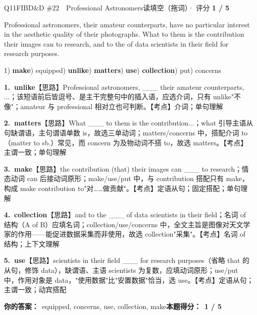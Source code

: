 \begin{qblock}{Q11\quad FIBD\&D \#22\ \ Professional Astronomers}{读填空（拖词）· 评分 \textcolor{cAccent}{\bfseries 1 / 5}}
\begin{promptbox}
Professional astronomers,  their amateur counterparts, have no particular interest in the aesthetic quality of their photographs. What  to them is the contribution their images can  to research, and to the  of data scientists in their field  for research purposes.
\end{promptbox}
{\small 1) \textbf{make}) equipped) \textbf{unlike}) \textbf{matters}) \textbf{use}) \textbf{collection}) put) concerns}
\begin{notebox}\footnotesize
\textbf{1.\ unlike}\quad【思路】Professional astronomers, \_\_\_ their amateur counterparts, ...；该短语前后皆逗号、是主干完整句中的插入语，应选介词，只有 unlike"不像"；amateur 与 professional 相对立也可判断。【考点】介词；单句理解\par\smallskip
\textbf{2.\ matters}\quad【思路】What \_\_\_ to them is the contribution...；what 引导主语从句缺谓语，主句谓语单数 is，故选三单动词；matters/concerns 中，搭配介词 to（matter to sb.）常见，而 concern 为及物动词不搭 to，故选 matters。【考点】主谓一致；单句理解\par\smallskip
\textbf{3.\ make}\quad【思路】the contribution (that) their images can \_\_\_ to research；情态动词 can 后接动词原形；make/use/put 中，与 contribution 搭配只有 make，构成 make contribution to"对……做贡献"。【考点】定语从句；固定搭配；单句理解\par\smallskip
\textbf{4.\ collection}\quad【思路】and to the \_\_\_ of data scientists in their field；名词 of 结构（A of B）应填名词；collection/use/concerns 中，全文主旨是图像对天文学家的作用——能促进数据采集而非使用，故选 collection"采集"。【考点】名词 of 结构；上下文理解\par\smallskip
\textbf{5.\ use}\quad【思路】scientists in their field \_\_\_ for research purposes（省略 that 的从句，修饰 data），缺谓语、主语 scientists 为复数，应填动词原形；use/put 中，作用对象是 data，"使用数据"比"安置数据"恰当，选 use。【考点】定语从句；主谓一致；动宾搭配
\end{notebox}
\smallskip
\textbf{你的答案：}\ {\color{cWrong}equipped, concerns, use}, collection, {\color{cWrong}make}\qquad\textbf{本题得分：}\ {\color{cAccent}\bfseries 1 / 5}
\end{qblock}


